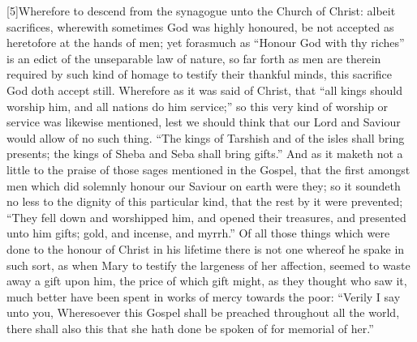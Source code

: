 [5]Wherefore to descend from the synagogue unto the Church of Christ: albeit sacrifices, wherewith sometimes God was highly honoured, be not accepted as heretofore at the hands of men; yet forasmuch as “Honour God with thy riches” is an edict of the unseparable law of nature, so far forth as men are therein required by such kind of homage to testify their thankful minds, this sacrifice God doth accept still. Wherefore as it was said of Christ, that “all kings should worship him, and all nations do him service;” so this very kind of worship or service was likewise mentioned, lest we should think that our Lord and Saviour would allow of no such thing. “The kings of Tarshish and of the isles shall bring presents; the kings of Sheba and Seba shall bring gifts.” And as it maketh not a little to the praise of those sages mentioned in the Gospel, that the first amongst men which did solemnly honour our Saviour on earth were they; so it soundeth no less to the dignity of this particular kind, that the rest by it were prevented; “They fell down and worshipped him, and opened their treasures, and presented unto him gifts; gold, and incense, and myrrh.” Of all those things which were done to the honour of Christ in his lifetime there is not one whereof he spake in such sort, as when Mary to testify the largeness of her affection, seemed to waste away a gift upon him, the price of which gift might, as they thought who saw it, much better have been spent in works of mercy towards the poor: “Verily I say unto you, Wheresoever this Gospel shall be preached throughout all the world, there shall also this that she hath done be spoken of for memorial of her.”

